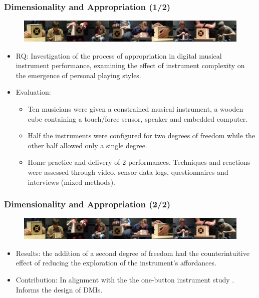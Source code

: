 \documentclass[screen, aspectratio=169]{beamer}
\begin{document}
\begin{frame}
\frametitle{Dimensionality and Appropriation (1/2)}	
\begin{figure}
	\includegraphics[scale=0.31]{img/Zappi-McPherson-2014-2.png}\\
    \end{figure}	
\begin{itemize}
\item RQ: Investigation of the process of appropriation in digital musical instrument performance, examining the effect of instrument complexity on the emergence of personal playing styles.
\item Evaluation:
\begin{itemize}
\item Ten musicians were given a constrained musical instrument, a wooden cube containing a touch/force sensor, speaker and embedded computer.
\item Half the instruments were configured for two degrees of freedom while the other half allowed only a single degree.
\item Home practice and delivery of 2 performances. Techniques and reactions were assessed through video, sensor data logs, questionnaires and interviews (mixed methods).
\end{itemize}
\end{itemize}
\end{frame}
%
\begin{frame}
\frametitle{Dimensionality and Appropriation (2/2)}	
\begin{figure}
	\includegraphics[scale=0.31]{img/Zappi-McPherson-2014-2.png}\\
    \end{figure}	
\begin{itemize}
\item Results: the addition of a second degree of freedom had the counterintuitive effect of reducing the exploration of the instrument's affordances.
\item Contribution: In alignment with the the one-button instrument study \cite{Gurevich.et.al.2010.NIME}. Informs the design of DMIs.
\end{itemize}
\end{frame}%
\end{document}
